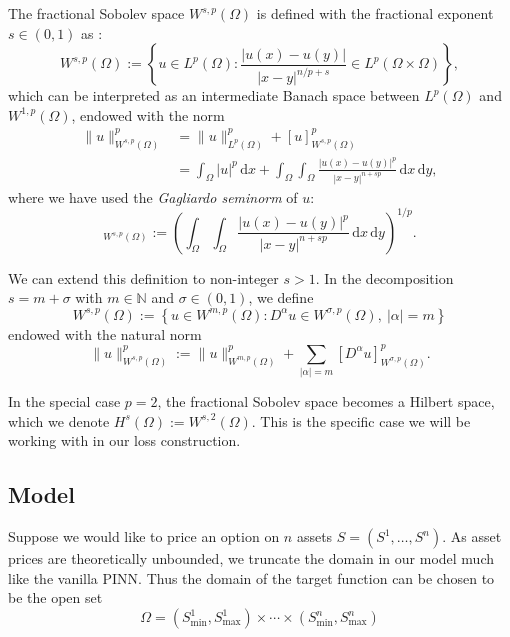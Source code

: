 The fractional Sobolev space $W^{s, p}(\Omega)$ is defined with the fractional exponent $s \in (0, 1)$ as \cite{di2012hitchhikers}:
\begin{equation}
    W^{s, p}(\Omega) := \left\{u \in L^p(\Omega) : \frac{|u(x) - u(y)|}{|x-y|^{n/p + s}} \in L^p(\Omega \times \Omega)\right\},
\end{equation}
which can be interpreted as an intermediate Banach space between $L^p(\Omega)$ and $W^{1, p}(\Omega)$, endowed with the norm
\begin{equation}
    \begin{aligned}
        \|u\|^p_{W^{s, p}(\Omega)} &= \|u\|^p_{L^p(\Omega)} + [u]^p_{W^{s, p}(\Omega)} \\
        &= \int_\Omega |u|^p \,\mathrm dx + \int_\Omega \int_\Omega \frac{|u(x)-u(y)|^p}{|x-y|^{n+sp}}\,\mathrm dx \, \mathrm dy,
    \end{aligned}
\end{equation}
where we have used the \textit{Gagliardo seminorm} of $u$:
\begin{equation}
    [u]_{W^{s, p}(\Omega)} := \left( \int_\Omega \int_\Omega \frac{|u(x)-u(y)|^p}{|x-y|^{n+sp}}\,\mathrm dx \, \mathrm dy\right)^{1/p}.
\end{equation}

We can extend this definition to non-integer $s > 1$. In the decomposition $s = m + \sigma$ with $m \in \mathbb N$ and $\sigma \in (0, 1)$, we define
\begin{equation}
    W^{s, p}(\Omega) := \left \{ u \in W^{m, p}(\Omega) : D^\alpha u \in W^{\sigma, p}(\Omega), \ |\alpha| = m \right\}
\end{equation}
endowed with the natural norm
\begin{equation}
    \|u\|^p_{W^{s,p}(\Omega)} := \|u\|^p_{W^{m,p}(\Omega)} + \sum_{|\alpha| = m} [D^\alpha u]^p_{W^{\sigma, p}(\Omega)}.
\end{equation}

In the special case $p=2$, the fractional Sobolev space becomes a Hilbert space, which we denote $H^s(\Omega) := W^{s, 2}(\Omega)$. This is the specific case we will be working with in our loss construction.

\subsection{Model}

Suppose we would like to price an option on $n$ assets $S = (S^1, \dots, S^n)$. As asset prices are theoretically unbounded, we truncate the domain in our model much like the vanilla PINN. Thus the domain of the target function can be chosen to be the open set
\begin{equation}
    \Omega = (S_\text{min}^1, S_\text{max}^1) \times \cdots \times (S_\text{min}^n, S_\text{max}^n)
\end{equation}

